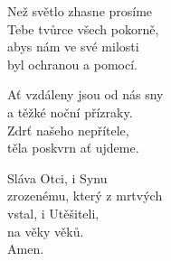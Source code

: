 \begin{translatioMulticol}{3}
Než světlo zhasne prosíme\\
Tebe tvůrce všech pokorně,\\
abys nám ve své milosti\\
byl ochranou a pomocí.\columnbreak

Ať vzdáleny jsou od nás sny\\
a těžké noční přízraky.\\
Zdrť našeho nepřítele,\\
těla poskvrn ať ujdeme.\columnbreak

Sláva Otci, i Synu\\
zrozenému, který z mrtvých\\
vstal, i Utěšiteli,\\
na věky věků.\\
Amen.
\end{translatioMulticol}
